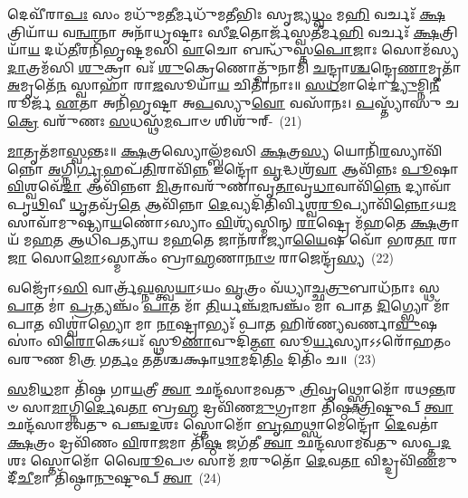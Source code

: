 {\anuvakamend[{𑌅𑌤𑍍𑌯𑍇𑌕𑌾᳴\-𑌦𑌶 𑌚}]}%

𑌦𑍇𑌵𑍀᳴𑌰𑌾\-\ul{𑌪𑌃} 𑌸𑌂 𑌮𑌧𑍁᳴𑌮\-\ul{𑌤𑍀}\-𑌰𑍍𑌮𑌧𑍁᳴𑌮𑌤𑍀𑌭𑌿𑌃 𑌸𑍃𑌜𑍍𑌯\-\ul{𑌧𑍍𑌵𑌂} 𑌮\-\ul{𑌹𑌿} 𑌵𑌰𑍍𑌚𑌃᳴ \ul{𑌕𑍍𑌷}\-𑌤𑍍𑌰𑌿𑌯𑌾᳴𑌯 𑌵\-\ul{𑌨𑍍𑌵𑌾}\-𑌨𑌾 𑌅𑌨𑌾᳴𑌧𑍃𑌷𑍍𑌟𑌾𑌃 𑌸𑍀\-\ul{𑌦}\-𑌤𑍋𑌰𑍍𑌜᳴𑌸𑍍𑌵\-\ul{𑌤𑍀}\-𑌰𑍍𑌮\-\ul{𑌹𑌿} 𑌵𑌰𑍍𑌚𑌃᳴ \ul{𑌕𑍍𑌷}\-𑌤𑍍𑌰𑌿𑌯𑌾᳴\-\ul{𑌯} 𑌦𑌧᳴\-\ul{𑌤𑍀}\-𑌰𑌨𑌿᳴𑌭𑍃𑌷𑍍𑌟𑌮𑌸𑌿 \ul{𑌵𑌾}\-𑌚𑍋 𑌬𑌨𑍍𑌧𑍁᳴𑌸𑍍𑌤\-\ul{𑌪𑍋}\-𑌜𑌾𑌃 𑌸𑍋𑌮᳴𑌸𑍍𑌯 \ul{𑌦𑌾}\-𑌤𑍍𑌰𑌮᳴𑌸𑌿 \ul{𑌶𑍁}\-𑌕𑍍𑌰𑌾 𑌵𑌃᳴ \ul{𑌶𑍁}\-𑌕𑍍𑌰𑍇𑌣𑍋𑌤𑍍𑌪𑍁᳴𑌨𑌾𑌮𑌿 \ul{𑌚}\-𑌨𑍍𑌦𑍍𑌰𑌾\-\ul{𑌶𑍍𑌚}\-𑌨𑍍𑌦𑍍𑌰𑍇\-\ul{𑌣𑌾}\-𑌮𑍃𑌤𑌾᳴ \ul{𑌅}\-𑌮𑍃𑌤𑍇᳴\-\ul{𑌨} 𑌸𑍍𑌵𑌾𑌹𑌾᳴ 𑌰𑌾\-\ul{𑌜}\-𑌸𑍂𑌯𑌾᳴\-\ul{𑌯} 𑌚𑌿𑌤𑌾᳴𑌨𑌾𑌃॥ \ul{𑌸}\-\-\ul{𑌧}\-𑌮𑌾𑌦𑍋॑ \ul{𑌦𑍍𑌯𑍁}\-𑌮𑍍𑌨𑌿\-\ul{𑌨𑍀}\-𑌰𑍂𑌰𑍍𑌜᳴ \ul{𑌏}\-𑌤𑌾 𑌅𑌨𑌿᳴𑌭𑍃𑌷𑍍𑌟𑌾 𑌅\-\ul{𑌪}\-𑌸𑍍𑌯𑍁\-\ul{𑌵𑍋} 𑌵𑌸𑌾᳴𑌨𑌃। \ul{𑌪}\-𑌸𑍍𑌤𑍍𑌯𑌾᳴𑌸𑍁 𑌚\-\ul{𑌕𑍍𑌰𑍇} 𑌵𑌰𑍁᳴𑌣𑌃 \ul{𑌸}\-𑌧𑌸𑍍𑌥᳴\-\ul{𑌮}\-𑌪𑌾𑍞 𑌶𑌿𑌶𑍁᳴𑌰𑍍-~(21)

\-\ul{𑌮𑌾}\-𑌤𑍃𑌤᳴𑌮𑌾\-\ul{𑌸𑍍𑌵}\-𑌨𑍍𑌤𑌃॥ \ul{𑌕𑍍𑌷}\-𑌤𑍍𑌰𑌸𑍍𑌯𑍋𑌲𑍍𑌬᳴𑌮𑌸𑌿 \ul{𑌕𑍍𑌷}\-𑌤𑍍𑌰\-\ul{𑌸𑍍𑌯} 𑌯𑍋𑌨𑌿᳴\-\ul{𑌰}\-𑌸𑍍𑌯𑌾𑌵𑌿᳴𑌨𑍍𑌨𑍋 \ul{𑌅}\-𑌗𑍍𑌨𑌿\-\ul{𑌰𑍍𑌗𑍃}\-𑌹𑌪᳴\-\ul{𑌤𑌿}\-𑌰𑌾𑌵𑌿᳴\-\ul{𑌨𑍍𑌨} 𑌇𑌨𑍍𑌦𑍍𑌰𑍋᳴ \ul{𑌵𑍃}\-𑌦𑍍𑌧𑌶𑍍𑌰᳴\-\ul{𑌵𑌾} 𑌆𑌵𑌿᳴𑌨𑍍𑌨𑌃 \ul{𑌪𑍂}\-𑌷𑌾 \ul{𑌵𑌿}\-𑌶𑍍𑌵𑌵𑍇᳴\-\ul{𑌦𑌾} 𑌆𑌵𑌿᳴𑌨𑍍𑌨𑍗 \ul{𑌮𑌿}\-𑌤𑍍𑌰𑌾𑌵𑌰𑍁᳴𑌣𑌾𑌵𑍃\-\ul{𑌤𑌾}\-𑌵𑍃\-\ul{𑌧𑌾}\-𑌵𑌾𑌵𑌿᳴\-\ul{𑌨𑍍𑌨𑍇} 𑌦𑍍𑌯𑌾𑌵𑌾᳴𑌪𑍃\-\ul{𑌥𑌿}\-𑌵𑍀 \ul{𑌧𑍃}\-𑌤𑌵𑍍𑌰᳴\-\ul{𑌤𑍇} 𑌆𑌵𑌿᳴𑌨𑍍𑌨𑌾 \ul{𑌦𑍇}\-𑌵𑍍𑌯𑌦𑌿᳴𑌤𑌿𑌰𑍍𑌵𑌿𑌶𑍍𑌵\-\ul{𑌰𑍂}\-𑌪𑍍𑌯𑌾𑌵𑌿᳴\-\ul{𑌨𑍍𑌨𑍋}\-\-𑌽𑌯\-\ul{𑌮}\-𑌸𑌾𑌵𑌾᳴𑌮𑍁𑌷𑍍𑌯𑌾\-\ul{𑌯}\-𑌣𑍋॑\-𑌽𑌸𑍍𑌯𑌾𑌂 \ul{𑌵𑌿}\-𑌶𑍍𑌯᳴𑌸𑍍𑌮𑌿𑌨𑍍 \ul{𑌰𑌾}\-𑌷𑍍𑌟𑍍𑌰𑍇 𑌮᳴\-\ul{𑌹}\-𑌤𑍇 \ul{𑌕𑍍𑌷}\-𑌤𑍍𑌰𑌾𑌯᳴ 𑌮\-\ul{𑌹}\-𑌤 𑌆𑌧𑌿᳴𑌪𑌤𑍍𑌯𑌾𑌯 𑌮\-\ul{𑌹}\-𑌤𑍇 𑌜𑌾𑌨᳴𑌰𑌾𑌜𑍍𑌯𑌾\-\ul{𑌯𑍈}\-𑌷 𑌵𑍋᳴ 𑌭𑌰\-\ul{𑌤𑌾} 𑌰𑌾\-\ul{𑌜𑌾} 𑌸𑍋\-\ul{𑌮𑍋}\-\-𑌽𑌸𑍍𑌮𑌾𑌕𑌂᳴ 𑌬𑍍𑌰𑌾\-\ul{𑌹𑍍𑌮}\-𑌣𑌾\-\ul{𑌨𑌾}\-\-\ul{𑍞} 𑌰𑌾𑌜𑍇𑌨𑍍𑌦𑍍𑌰᳴\-\ul{𑌸𑍍𑌯}\-~(22)

𑌵𑌜𑍍𑌰𑍋᳴\-𑌽\-\ul{𑌸𑌿} 𑌵𑌾𑌰𑍍𑌤𑍍𑌰᳴\-\ul{𑌘𑍍𑌨}\-𑌸𑍍𑌤𑍍𑌵\-\ul{𑌯𑌾}\-𑌽𑌯𑌂 \ul{𑌵𑍃}\-𑌤𑍍𑌰𑌂 𑌵᳴𑌧𑍍𑌯𑌾𑌚𑍍𑌛\-\ul{𑌤𑍍𑌰𑍁}\-𑌬𑌾𑌧᳴𑌨𑌾𑌃 𑌸𑍍𑌥 \ul{𑌪𑌾}\-𑌤 𑌮𑌾॑ \ul{𑌪𑍍𑌰}\-𑌤𑍍𑌯𑌞𑍍𑌚𑌂᳴ \ul{𑌪𑌾}\-𑌤 𑌮𑌾᳴ \ul{𑌤𑌿}\-𑌰𑍍𑌯𑌞𑍍𑌚᳴\-\ul{𑌮}\-𑌨𑍍𑌵𑌞𑍍𑌚𑌂᳴ 𑌮𑌾 𑌪𑌾𑌤 \ul{𑌦𑌿}\-𑌗𑍍𑌭𑍍𑌯𑍋 𑌮𑌾᳴ 𑌪𑌾\-\ul{𑌤} 𑌵𑌿𑌶𑍍𑌵𑌾॑𑌭𑍍𑌯𑍋 𑌮𑌾 \ul{𑌨𑌾}\-𑌷𑍍𑌟𑍍𑌰𑌾𑌭𑍍𑌯𑌃᳴ 𑌪𑌾\-\ul{𑌤} 𑌹𑌿𑌰᳴𑌣𑍍𑌯𑌵𑌰𑍍𑌣𑌾\-\ul{𑌵𑍁}\-𑌷𑌸𑌾𑌂॑ 𑌵𑌿\-\ul{𑌰𑍋}\-𑌕𑍇\-𑌽𑌯𑌃᳴ 𑌸𑍍𑌥𑍂\-\ul{𑌣𑌾}\-𑌵𑍁𑌦𑌿᳴\-\ul{𑌤𑍗} 𑌸𑍂\-\ul{𑌰𑍍𑌯}\-𑌸𑍍𑌯𑌾\-𑌽\-𑌽𑌰𑍋᳴𑌹𑌤𑌂 𑌵𑌰𑍁𑌣 𑌮𑌿\-\ul{𑌤𑍍𑌰} 𑌗\-\ul{𑌰𑍍𑌤𑌂} 𑌤𑌤᳴𑌶𑍍𑌚𑌕𑍍𑌷𑌾\-\ul{𑌥𑌾}\-𑌮𑌦𑌿᳴\-\ul{𑌤𑌿𑌂} 𑌦𑌿𑌤𑌿𑌂᳴ 𑌚॥~(23)

{\anuvakamend[{𑌶𑌿\-\ul{𑌶𑍁}\-𑌰𑌿\-\ul{𑌨𑍍𑌦𑍍𑌰}\-𑌸𑍍𑌯𑍈𑌕᳴𑌚𑌤𑍍𑌵𑌾𑌰𑌿𑍞𑌶𑌚𑍍𑌚}]}%

\-\ul{𑌸}\-𑌮𑌿\-\ul{𑌧}\-𑌮𑌾 𑌤𑌿᳴𑌷𑍍𑌠 𑌗𑌾\-\ul{𑌯}\-𑌤𑍍𑌰𑍀 \ul{𑌤𑍍𑌵𑌾} 𑌛𑌨𑍍𑌦᳴𑌸𑌾𑌮𑌵𑌤𑍁 \ul{𑌤𑍍𑌰𑌿}\-𑌵𑍃𑌥𑍍𑌸𑍍𑌤𑍋𑌮𑍋᳴ 𑌰𑌥\-\ul{𑌨𑍍𑌤}\-𑌰𑍞 𑌸𑌾\-\ul{𑌮𑌾}\-𑌗𑍍𑌨𑌿\-\ul{𑌰𑍍𑌦𑍇}\-𑌵\-\ul{𑌤𑌾} 𑌬𑍍𑌰\-\ul{𑌹𑍍𑌮} 𑌦𑍍𑌰𑌵𑌿᳴𑌣\-\ul{𑌮𑍁}\-𑌗𑍍𑌰𑌾𑌮𑌾 𑌤𑌿᳴𑌷𑍍𑌠 \ul{𑌤𑍍𑌰𑌿}\-𑌷𑍍𑌟𑍁𑌪𑍍 \ul{𑌤𑍍𑌵𑌾} 𑌛𑌨𑍍𑌦᳴𑌸𑌾𑌮𑌵𑌤𑍁 𑌪𑌞𑍍𑌚\-\ul{𑌦}\-𑌶𑌃 𑌸𑍍𑌤𑍋𑌮𑍋᳴ \ul{𑌬𑍃}\-𑌹𑌥𑍍𑌸𑌾𑌮𑍇𑌨𑍍𑌦𑍍𑌰𑍋᳴ \ul{𑌦𑍇}\-𑌵𑌤𑌾॑ \ul{𑌕𑍍𑌷}\-𑌤𑍍𑌰𑌂 𑌦𑍍𑌰𑌵𑌿᳴𑌣𑌂 \ul{𑌵𑌿}\-𑌰𑌾\-\ul{𑌜}\-𑌮𑌾 𑌤𑌿᳴\-\ul{𑌷𑍍𑌠} 𑌜𑌗᳴𑌤𑍀 \ul{𑌤𑍍𑌵𑌾} 𑌛𑌨𑍍𑌦᳴𑌸𑌾𑌮𑌵𑌤𑍁 𑌸𑌪𑍍𑌤\-\ul{𑌦}\-𑌶𑌃 𑌸𑍍𑌤𑍋𑌮𑍋᳴ 𑌵𑍈\-\ul{𑌰𑍂}\-𑌪𑍞 𑌸𑌾𑌮᳴ \ul{𑌮}\-𑌰𑍁𑌤𑍋᳴ \ul{𑌦𑍇}\-𑌵\-\ul{𑌤𑌾} 𑌵𑌿𑌡𑍍𑌦𑍍𑌰𑌵𑌿᳴\-\ul{𑌣}\-𑌮𑍁𑌦𑍀᳴\-\ul{𑌚𑍀}\-𑌮𑌾 𑌤𑌿᳴𑌷𑍍𑌠𑌾\-\ul{𑌨𑍁}\-𑌷𑍍𑌟𑍁𑌪𑍍 \ul{𑌤𑍍𑌵𑌾}\-~(24)

